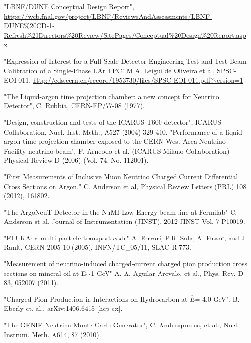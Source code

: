 \begin{thebibliography}{99}

%
%

%
%

 "LBNF/DUNE Conceptual Design Report",  \url{https://web.fnal.gov/project/LBNF/ReviewsAndAssessments/LBNF-DUNE\%20CD-1-Refresh\%20Directors\%20Review/SitePages/Conceptual\%20Design\%20Report.aspx}

 "Expression of Interest for a Full-Scale Detector Engineering Test and Test Beam Calibration of a Single-Phase LAr TPC" M.A. Leigui de Oliveira et al, SPSC-EOI-011, \url{http://cds.cern.ch/record/1953730/files/SPSC-EOI-011.pdf?version=1}

"The Liquid-argon time projection chamber: a new concept for Neutrino Detector", C. Rubbia, CERN-EP/77-08 (1977).

 "Design, construction and tests of the ICARUS T600 detector", ICARUS Collaboration, Nucl. Inst. Meth., A527 (2004) 329-410. 
"Performance of a liquid argon time projection chamber exposed to the CERN West Area Neutrino Facility neutrino beam", F. Arneodo et al. (ICARUS-Milano Collaboration) - Physical Review D (2006) (Vol. 74, No. 112001). 

 "First Measurements of Inclusive Muon Neutrino Charged Current Differential Cross Sections on Argon." C. Anderson et al, Physical Review Letters (PRL) 108 (2012), 161802. 

 "The ArgoNeuT Detector in the NuMI Low-Energy beam line at Fermilab" C. Anderson et al, Journal of Instrumentation (JINST), 2012 JINST Vol. 7 P10019. 

 "FLUKA: a multi-particle transport code" A. Ferrari, P.R. Sala, A. Fasso`, and J. Ranft, CERN-2005-10 (2005), INFN/TC\_05/11, SLAC-R-773.

  "Measurement of neutrino-induced charged-current charged pion production cross sections on mineral oil at E$\sim$1 GeV" A. A. Aguilar-Arevalo, et al., Phys. Rev. D 83, 052007 (2011).

 "Charged Pion Production in Interactions on Hydrocarbon 
at $\overline{E}$= 4.0 GeV", B. Eberly et. al., arXiv:1406.6415 [hep-ex].

 "The GENIE Neutrino Monte Carlo Generator", C. Andreopoulos, et al., Nucl. Instrum. Meth. A614, 87 (2010).


\end{thebibliography}
